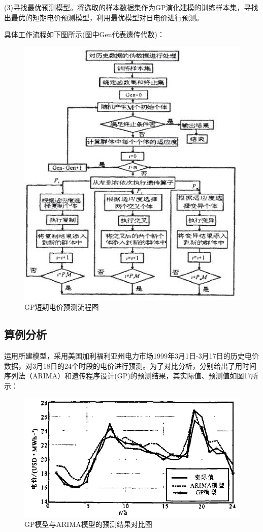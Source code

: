 \documentclass[UTF8]{ctexart}
\begin{document}
\newpage
(3)寻找最优预测模型。将选取的样本数据集作为GP演化建模的训练样本集，寻找出最优的短期电价预测模型，利用最优模型对日电价进行预测。

具体工作流程如下图所示(图中Gen代表遗传代数)：
	\begin{figure}[ht]
		\centering	
		\includegraphics[scale=0.6]{images/example_workflow.png}
		\caption{GP短期电价预测流程图}
		\label{fig:label}
	\end{figure}

\subsection{算例分析}
运用所建模型，采用美国加利福利亚州电力市场1999年3月1日-3月17日的历史电价数据，对3月18日的24个时段的电价进行预测。为了对比分析，分别给出了用时间序列法（ARIMA）和遗传程序设计(GP)的预测结果，其实际值、预测值如图17所示：
	\begin{figure}[ht]
		\centering	
		\includegraphics[scale=0.6]{images/example_result_fig.png}
		\caption{GP模型与ARIMA模型的预测结果对比图}
		\label{fig:label}
	\end{figure}
\end{document}
